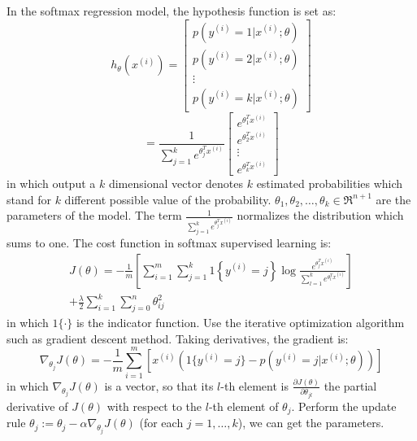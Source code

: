\documentclass{bmcart}
\begin{document}
In the softmax regression model, the hypothesis function is set as:
\begin{equation}
h_{\theta}(x^{(i)}) = 
\left[
      \begin{array}{cccccc}
        p(y^{(i)}=1|x^{(i)};\theta) \\
        p(y^{(i)}=2|x^{(i)};\theta) \\
        \vdots \\
        p(y^{(i)}=k|x^{(i)};\theta)
      \end{array}
    \right]
\end{equation}
\begin{equation}
= \frac{1}{\sum_{j=1}^ke^{\theta_j^Tx^{(i)}}}
\left[
      \begin{array}{cccccc}
        e^{\theta_1^Tx^{(i)}}\\
        e^{\theta_2^Tx^{(i)}}\\
        \vdots \\
        e^{\theta_k^Tx^{(i)}}
      \end{array}
    \right]
\end{equation}
in which output a $k$ dimensional vector denotes $k$ estimated probabilities which stand for $k$ different possible value of the probability. $\theta_1, \theta_2, \ldots, \theta_k \in \Re^{n+1}$ are the parameters of the model. The term $\frac{1}{ \sum_{j=1}^{k}{e^{ \theta_j^T x^{(i)} }} }$  normalizes the distribution which sums to one. The cost function in softmax supervised learning is:
\begin{equation}
\begin{split}
J(\theta) = - \frac{1}{m} \left[ \sum_{i=1}^{m} \sum_{j=1}^{k} 1\left\{y^{(i)} = j\right\} \log \frac{e^{\theta_j^T x^{(i)}}}{\sum_{l=1}^k e^{ \theta_l^T x^{(i)} }}  \right] \\
              + \frac{\lambda}{2} \sum_{i=1}^k \sum_{j=0}^n \theta_{ij}^2
\end{split}
\end{equation}
in which $1\{\cdot\}$ is the indicator function.
Use the iterative optimization algorithm such as gradient descent method. Taking derivatives, the gradient is:
\begin{equation}
\nabla_{\theta_j} J(\theta) = - \frac{1}{m} \sum_{i=1}^{m}{ [ x^{(i)} ( 1\{ y^{(i)} = j\}  - p(y^{(i)} = j | x^{(i)}; \theta) ) ]}
\end{equation}
in which  $\nabla_{\theta_j} J(\theta)$ is a vector, so that its $l$-th element is $\frac{\partial J(\theta)}{\partial \theta_{jl}}$ the partial derivative of $J(\theta)$ with respect to the $l$-th element of $\theta_j$.
Perform the update rule $\theta_j := \theta_j - \alpha \nabla_{\theta_j} J(\theta)$ (for each $j=1,\ldots,k$), we can get the parameters.
\end{document}
